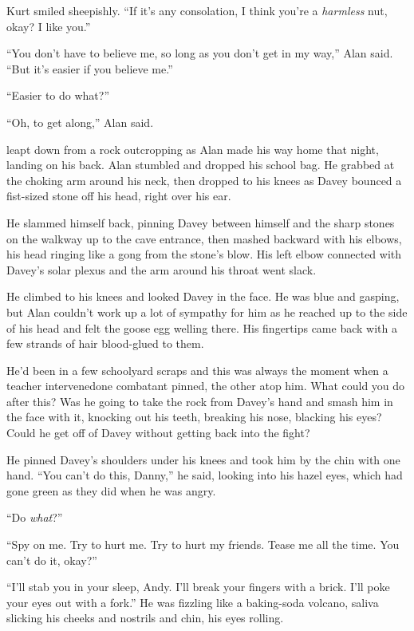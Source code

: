 Kurt smiled sheepishly.  ``If it's any consolation, I think you're a
\textit{harmless} nut, okay?  I like you.''

``You don't have to believe me, so long as you don't get in my way,''
Alan said.  ``But it's easier if you believe me.''

``Easier to do what?''

``Oh, to get along,'' Alan said.

 leapt down from a rock outcropping as Alan made his way home
that night, landing on his back.  Alan stumbled and dropped his school
bag.  He grabbed at the choking arm around his neck, then dropped to
his knees as Davey bounced a fist-sized stone off his head, right over
his ear.

He slammed himself back, pinning Davey between himself and the sharp
stones on the walkway up to the cave entrance, then mashed backward
with his elbows, his head ringing like a gong from the stone's blow. 
His left elbow connected with Davey's solar plexus and the arm around
his throat went slack.

He climbed to his knees and looked Davey in the face.  He was blue and
gasping, but Alan couldn't work up a lot of sympathy for him as he
reached up to the side of his head and felt the goose egg welling
there.  His fingertips came back with a few strands of hair
blood-glued to them.

He'd been in a few schoolyard scraps and this was always the moment
when a teacher intervened\dash{}one combatant pinned, the other atop him. 
What could you do after this?  Was he going to take the rock from
Davey's hand and smash him in the face with it, knocking out his
teeth, breaking his nose, blacking his eyes?  Could he get off of
Davey without getting back into the fight?

He pinned Davey's shoulders under his knees and took him by the chin
with one hand.  ``You can't do this, Danny,'' he said, looking into
his hazel eyes, which had gone green as they did when he was angry.

``Do \textit{what}?''

``Spy on me.  Try to hurt me.  Try to hurt my friends.  Tease me all
the time.  You can't do it, okay?''

``I'll stab you in your sleep, Andy.  I'll break your fingers with a
brick.  I'll poke your eyes out with a fork.'' He was fizzling like a
baking-soda volcano, saliva slicking his cheeks and nostrils and chin,
his eyes rolling.

